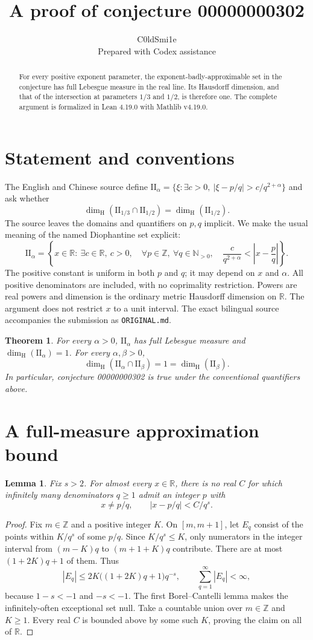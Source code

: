 \documentclass[10pt]{article}
\title{A proof of conjecture 00000000302}
\author{C0ldSmi1e\\\small Prepared with Codex assistance}
\date{}
\newtheorem{theorem}{Theorem}
\newtheorem{lemma}{Lemma}
\newcommand{\II}{\mathrm{II}}
\newcommand{\R}{\mathbb R}
\newcommand{\Z}{\mathbb Z}
\newcommand{\N}{\mathbb N}
\newcommand{\dimH}{\dim_{\mathrm H}}
\begin{document}
\maketitle
\begin{abstract}
For every positive exponent parameter, the exponent-badly-approximable set in the conjecture has full Lebesgue measure in the real line. Its Hausdorff dimension, and that of the intersection at parameters $1/3$ and $1/2$, is therefore one. The complete argument is formalized in Lean 4.19.0 with Mathlib v4.19.0.
\end{abstract}

\section{Statement and conventions}
The English and Chinese source define
$\II_\alpha=\{\xi:\exists c>0,\ |\xi-p/q|>c/q^{2+\alpha}\}$
and ask whether
\[
  \dimH(\II_{1/3}\cap\II_{1/2})=\dimH(\II_{1/2}).
\]
The source leaves the domains and quantifiers on $p,q$ implicit. We make the usual meaning of the named Diophantine set explicit:
\[
\II_\alpha=\left\{x\in\R:\ \exists c\in\R,\ c>0,\quad
 \forall p\in\Z,\ \forall q\in\N_{>0},\quad
 \frac{c}{q^{2+\alpha}}<\left|x-\frac pq\right|\right\}.
\]
The positive constant is uniform in both $p$ and $q$; it may depend on $x$ and $\alpha$. All positive denominators are included, with no coprimality restriction. Powers are real powers and dimension is the ordinary metric Hausdorff dimension on $\R$. The argument does not restrict $x$ to a unit interval. The exact bilingual source accompanies the submission as \texttt{ORIGINAL.md}.

\begin{theorem}\label{thm:main}
For every $\alpha>0$, $\II_\alpha$ has full Lebesgue measure and $\dimH(\II_\alpha)=1$. For every $\alpha,\beta>0$,
\[
\dimH(\II_\alpha\cap\II_\beta)=1=\dimH(\II_\beta).
\]
In particular, conjecture 00000000302 is true under the conventional quantifiers above.
\end{theorem}

\section{A full-measure approximation bound}
\begin{lemma}\label{lem:ae}
Fix $s>2$. For almost every $x\in\R$, there is no real $C$ for which infinitely many denominators $q\ge1$ admit an integer $p$ with
\[
 x\ne p/q,\qquad |x-p/q|<C/q^s.
\]
\end{lemma}
\begin{proof}
Fix $m\in\Z$ and a positive integer $K$. On $[m,m+1]$, let $E_q$ consist of the points within $K/q^s$ of some $p/q$. Since $K/q^s\le K$, only numerators in the integer interval from $(m-K)q$ to $(m+1+K)q$ contribute. There are at most $(1+2K)q+1$ of them. Thus
\[
 |E_q|\le 2K\bigl((1+2K)q+1\bigr)q^{-s},
 \qquad \sum_{q=1}^{\infty}|E_q|<\infty,
\]
because $1-s<-1$ and $-s<-1$. The first Borel--Cantelli lemma makes the infinitely-often exceptional set null. Take a countable union over $m\in\Z$ and $K\ge1$. Every real $C$ is bounded above by some such $K$, proving the claim on all of $\R$.
\end{proof}
\end{document}
